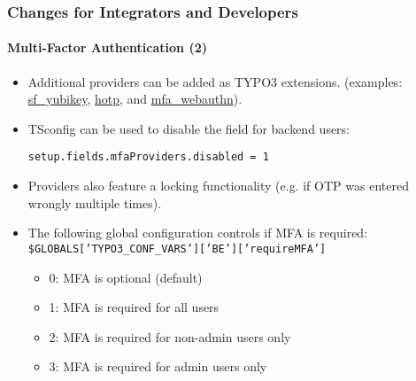 %

\begin{frame}[fragile]
	\frametitle{Changes for Integrators and Developers}
	\framesubtitle{Multi-Factor Authentication (2)}


	\begin{itemize}

		\item Additional providers can be added as TYPO3 extensions.\newline
			\smaller
				(examples:
				\href{https://github.com/derhansen/sf_yubikey}{sf\_yubikey},
				\href{https://github.com/o-ba/hotp}{hotp}, and
				\href{https://github.com/bnf/mfa_webauthn}{mfa_webauthn}).
			\normalsize
		\item TSconfig can be used to disable the field for backend users:
\begin{lstlisting}
setup.fields.mfaProviders.disabled = 1
\end{lstlisting}

	\item Providers also feature a locking functionality
		(e.g. if OTP was entered wrongly multiple times).

		\item The following global configuration controls if MFA is required:\newline
			\smaller\texttt{\$GLOBALS['TYPO3\_CONF\_VARS']['BE']['requireMFA']}\normalsize
			\begin{itemize}
				\item 0: MFA is optional (default)
				\item 1: MFA is required for all users
				\item 2: MFA is required for non-admin users only
				\item 3: MFA is required for admin users only
			\end{itemize}
	\end{itemize}

\end{frame}

